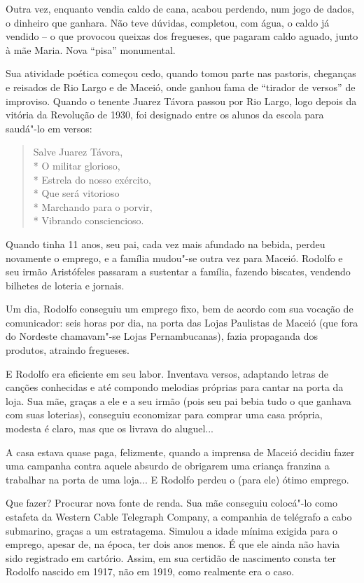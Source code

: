 Outra vez, enquanto vendia caldo de cana, acabou perdendo, num jogo de
dados, o dinheiro que ganhara. Não teve dúvidas, completou, com água, o
caldo já vendido -- o que provocou queixas dos fregueses, que
pagaram caldo aguado, junto à mãe Maria. Nova
``pisa'' monumental.

Sua atividade poética começou cedo, quando tomou parte nas pastoris,
cheganças e reisados de Rio Largo e de Maceió, onde ganhou fama de
``tirador de versos'' de improviso. Quando o
tenente Juarez Távora passou por Rio Largo, logo depois da vitória da
Revolução de 1930, foi designado entre os alunos da escola para
saudá"-lo em versos:

\begin{verse}
Salve Juarez Távora,\\*
O militar glorioso,\\*
Estrela do nosso exército,\\*
Que será vitorioso\\*
Marchando para o porvir,\\*
Vibrando consciencioso.
\end{verse}

Quando tinha 11 anos, seu pai, cada vez mais afundado na bebida, perdeu
novamente o emprego, e a família mudou"-se outra vez para Maceió.
Rodolfo e seu irmão Aristófeles passaram a sustentar a família, fazendo
biscates, vendendo bilhetes de loteria e jornais.

Um dia, Rodolfo conseguiu um emprego fixo, bem de acordo com sua
vocação de comunicador: seis horas por dia, na porta das Lojas
Paulistas de Maceió (que fora do Nordeste chamavam"-se Lojas
Pernambucanas), fazia propaganda dos produtos, atraindo fregueses.

E Rodolfo era eficiente em seu labor. Inventava versos, adaptando
letras de canções conhecidas e até compondo melodias próprias para
cantar na porta da loja. Sua mãe, graças a ele e a seu irmão (pois seu
pai bebia tudo o que ganhava com suas loterias), conseguiu economizar
para comprar uma casa própria, modesta é claro, mas que os livrava do
aluguel...

A casa estava quase paga, felizmente, quando a imprensa de Maceió
decidiu fazer uma campanha contra aquele absurdo de obrigarem uma
criança franzina a trabalhar na porta de uma loja... E Rodolfo perdeu o
(para ele) ótimo emprego.

Que fazer? Procurar nova fonte de renda. Sua mãe conseguiu colocá"-lo
como estafeta da Western Cable Telegraph Company, a companhia de
telégrafo a cabo submarino, graças a um estratagema. Simulou a idade
mínima exigida para o emprego, apesar de, na época, ter dois anos
menos. É que ele ainda não havia sido registrado em cartório. Assim, em
sua certidão de nascimento consta ter Rodolfo nascido em 1917, não em
1919, como realmente era o caso.

